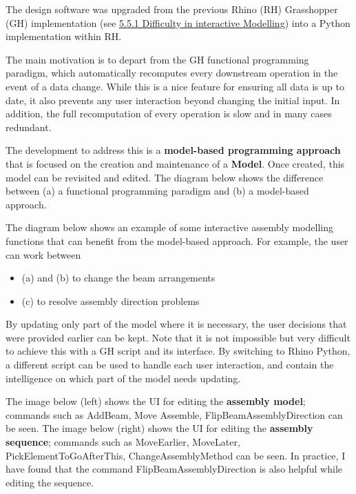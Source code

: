 The design software was upgraded from the previous Rhino (RH) Grasshopper (GH) implementation (see \ul{5.5.1 Difficulty in interactive Modelling}) into a Python implementation within RH.

The main motivation is to depart from the GH functional programming paradigm, which automatically recomputes every downstream operation in the event of a data change. While this is a nice feature for ensuring all data is up to date, it also prevents any user interaction beyond changing the initial input. In addition, the full recomputation of every operation is slow and in many cases redundant.

The development to address this is a \textbf{model-based programming approach} that is focused on the creation and maintenance of a \textbf{Model}. Once created, this model can be revisited and edited. The diagram below shows the difference between (a) a functional programming paradigm and (b) a model-based approach.



The diagram below shows an example of some interactive assembly modelling functions that can benefit from the model-based approach. For example, the user can work between

\begin{itemize}
	\item (a) and (b) to change the beam arrangements

	\item (c) to resolve assembly direction problems

\end{itemize}
By updating only part of the model where it is necessary, the user decisions that were provided earlier can be kept. Note that it is not impossible but very difficult to achieve this with a GH script and its interface. By switching to Rhino Python, a different script can be used to handle each user interaction, and contain the intelligence on which part of the model needs updating.



The image below (left) shows the UI for editing the \textbf{assembly model}; commands such as AddBeam, Move Assemble, FlipBeamAssemblyDirection can be seen. The image below (right) shows the UI for editing the \textbf{assembly sequence}; commands such as MoveEarlier, MoveLater, PickElementToGoAfterThis, ChangeAssemblyMethod can be seen. In practice, I have found that the command FlipBeamAssemblyDirection is also helpful while editing the sequence.

